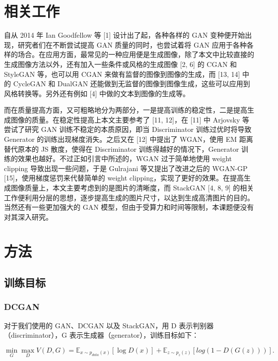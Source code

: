 \documentclass{article}
\begin{document}
\begin{CJK*}{UTF8}{gbsn}
\section{相关工作}

  自从 2014 年 Ian Goodfellow 等 [1] 设计出了起，各种各样的 GAN 变种便开始出现，研究者们在不断尝试提高 GAN 质量的同时，也尝试着将 GAN 应用于各种各样的场合。在应用方面，最常见的一种应用便是生成图像，除了本文中比较直接的生成图像方法以外，还有加入一些条件或风格的生成图像 [2, 6] 的 CGAN 和 StyleGAN 等，也可以用 CGAN 来做有监督的图像到图像的生成，而 [13, 14] 中的 CycleGAN 和 DualGAN 还能做到无监督的图像到图像生成，这些可以应用到风格转换等。另外还有例如 [4] 中做的文本到图像的生成等。

  而在质量提高方面，又可粗略地分为两部分，一是提高训练的稳定性，二是提高生成图像的质量。在稳定性提高上本文主要参考了 [11, 12]，在 [11] 中 Arjovsky 等尝试了研究 GAN 训练不稳定的本质原因，即当 Discriminator 训练过优时将导致 Generator 的训练出现梯度消失。之后又在 [12] 中提出了 WGAN，使用 EM 距离替代原本的 JS 散度，使得在 Discriminator 训练得越好的情况下，Generator 训练的效果也越好。不过正如引言中所述的，WGAN 过于简单地使用 weight clipping 导致出现一些问题，于是 Gulrajani 等又提出了改进之后的 WGAN-GP [15]，使用梯度惩罚来代替简单的 weight clipping，实现了更好的效果。在提高生成图像质量上，本文主要考虑到的是图片的清晰度，而 StackGAN [4, 8, 9] 的相关工作便利用分层的思想，逐步提高生成的图片尺寸，以达到生成高清图片的目的。当然还有一些更加强大的 GAN 模型，但由于受算力和时间等限制，本课题便没有对其深入研究。

\section{方法}

  \subsection{训练目标}
  
	 \subsubsection{DCGAN}

	 对于我们使用的 GAN、DCGAN 以及 StackGAN，用 D 表示判别器（discriminator），G 表示生成器（generator），训练目标如下：
	
	 \begin{equation}
	   \min_G\max_D V(D, G) = \mathbb{E}_{x\sim p_{data}(x)}[\log D(x)] + \mathbb{E}_{z\sim p_z(z)}[log(1-D(G(z)))].
	 \end{equation}
	 

\end{CJK*}
\end{document}
